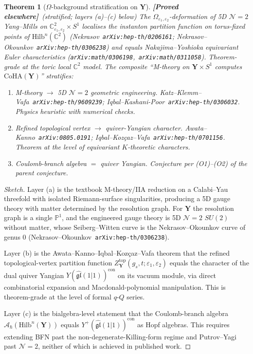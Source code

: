 \documentclass[11pt]{amsart}
\newtheorem{theorem}{Theorem}[section]
\theoremstyle{definition}
\providecommand{\CoHA}{\mathrm{CoHA}}
\providecommand{\bY}{\mathbf{Y}}
\providecommand{\bC}{\mathbb{C}}
\providecommand{\bP}{\mathbb{P}}
\providecommand{\fgl}{\mathfrak{gl}}
\providecommand{\cN}{\mathcal{N}}
\providecommand{\cA}{\mathcal{A}}
\providecommand{\ClaimStatusProvedElsewhere}{\textbf{\textsf{[Proved elsewhere]}}}
\begin{document}
\begin{theorem}[$\Omega$-background stratification on $\bY$]
\label{thm:omega-background-stratification}
\ClaimStatusProvedElsewhere\ \emph{(stratified; layers (a)--(c) below)}
The $\Omega_{\varepsilon_1,\varepsilon_2}$-deformation of 5D $\cN=2$
Yang--Mills on $\bC^2_{\varepsilon_1,\varepsilon_2} \times S^1$
localises the instanton partition function on torus-fixed points of
$\mathrm{Hilb}^n(\bC^2)$
(Nekrasov~\texttt{arXiv:hep-th/0206161};
Nekrasov--Okounkov~\texttt{arXiv:hep-th/0306238}) and equals
Nakajima--Yoshioka equivariant Euler characteristics
(\texttt{arXiv:math/0306198},~\texttt{arXiv:math/0311058}).
Theorem-grade at the toric local $\bC^2$ model. The composite
``M-theory on $\bY \times S^1$ computes $\CoHA(\bY)$'' stratifies:
\begin{enumerate}[leftmargin=2em,label=(\alph*)]
\item \emph{M-theory $\to$ 5D $\cN=2$ geometric engineering.}
  Katz--Klemm--Vafa~\texttt{arXiv:hep-th/9609239};
  Iqbal--Kashani-Poor~\texttt{arXiv:hep-th/0306032}. \emph{Physics
  heuristic} with numerical checks.
\item \emph{Refined topological vertex $\to$ quiver-Yangian character.}
  Awata--Kanno~\texttt{arXiv:0805.0191};
  Iqbal--Koz\c{c}az--Vafa~\texttt{arXiv:hep-th/0701156}. \emph{Theorem
  at the level of equivariant $K$-theoretic characters.}
\item \emph{Coulomb-branch algebra $=$ quiver Yangian.}
  \emph{Conjecture} per (O1)--(O2) of the parent conjecture.
\end{enumerate}
\end{theorem}

\begin{proof}[Sketch]
Layer (a) is the textbook M-theory/IIA reduction on a Calabi--Yau
threefold with isolated Riemann-surface singularities, producing a 5D
gauge theory with matter determined by the resolution graph. For
$\bY$ the resolution graph is a single $\bP^1$, and the engineered
gauge theory is 5D $\cN=2$ $SU(2)$ without matter, whose Seiberg--Witten
curve is the Nekrasov--Okounkov curve of genus $0$
(Nekrasov--Okounkov~\texttt{arXiv:hep-th/0306238}).

Layer (b) is the Awata--Kanno--Iqbal--Koz\c{c}az--Vafa theorem that
the refined topological-vertex partition function
$Z^{\mathrm{top}}_{\bY}(g_s, t; \varepsilon_1, \varepsilon_2)$ equals
the character of the dual quiver Yangian
$Y(\widehat{\fgl}(1|1))^{\mathrm{con}}$ on its vacuum module, via
direct combinatorial expansion and Macdonald-polynomial manipulation.
This is theorem-grade at the level of formal $q$-$Q$ series.

Layer (c) is the bialgebra-level statement that the Coulomb-branch
algebra $\cA_\hbar(\mathrm{Hilb}^n(\bY))$ equals
$Y^+(\widehat{\fgl}(1|1))^{\mathrm{con}}$ as Hopf algebras. This
requires extending BFN past the non-degenerate-Killing-form regime
and Putrov--Yagi past $\cN=2$, neither of which is achieved in
published work.
\end{proof}
\end{document}
